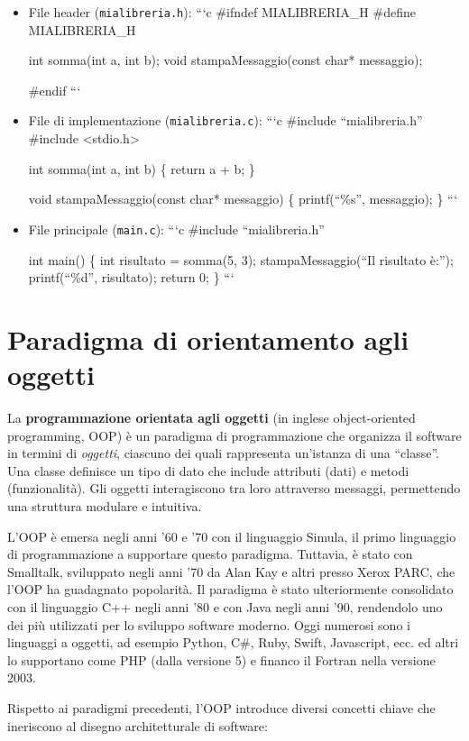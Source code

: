 \documentclass[
  letterpaper,
]{scrbook}
\begin{document}
\begin{itemize}
\item
  File header (\texttt{mialibreria.h}): ```c \#ifndef MIALIBRERIA\_H
  \#define MIALIBRERIA\_H

  int somma(int a, int b); void stampaMessaggio(const char* messaggio);

  \#endif ```
\item
  File di implementazione (\texttt{mialibreria.c}): ```c \#include
  ``mialibreria.h'' \#include \textless stdio.h\textgreater{}

  int somma(int a, int b) \{ return a + b; \}

  void stampaMessaggio(const char* messaggio) \{ printf(``\%s\n'',
  messaggio); \} ```
\item
  File principale (\texttt{main.c}): ```c \#include ``mialibreria.h''

  int main() \{ int risultato = somma(5, 3); stampaMessaggio(``Il
  risultato è:''); printf(``\%d\n'', risultato); return 0; \} ```
\end{itemize}

\section{Paradigma di orientamento agli
oggetti}\label{paradigma-di-orientamento-agli-oggetti}

La \textbf{programmazione orientata agli oggetti} (in inglese
object-oriented programming, OOP) è un paradigma di programmazione che
organizza il software in termini di \emph{oggetti}, ciascuno dei quali
rappresenta un'istanza di una ``classe''. Una classe definisce un tipo
di dato che include attributi (dati) e metodi (funzionalità). Gli
oggetti interagiscono tra loro attraverso messaggi, permettendo una
struttura modulare e intuitiva.

L'OOP è emersa negli anni '60 e '70 con il linguaggio Simula, il primo
linguaggio di programmazione a supportare questo paradigma. Tuttavia, è
stato con Smalltalk, sviluppato negli anni '70 da Alan Kay e altri
presso Xerox PARC, che l'OOP ha guadagnato popolarità. Il paradigma è
stato ulteriormente consolidato con il linguaggio C++ negli anni '80 e
con Java negli anni '90, rendendolo uno dei più utilizzati per lo
sviluppo software moderno. Oggi numerosi sono i linguaggi a oggetti, ad
esempio Python, C\#, Ruby, Swift, Javascript, ecc. ed altri lo
supportano come PHP (dalla versione 5) e financo il Fortran nella
versione 2003.

Rispetto ai paradigmi precedenti, l'OOP introduce diversi concetti
chiave che ineriscono al disegno architetturale di software:
\end{document}
